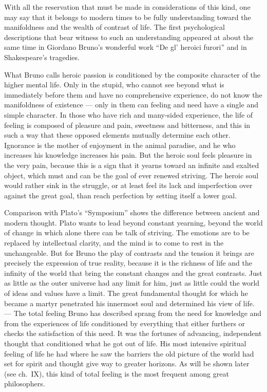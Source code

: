 \documentclass[12pt]{book}
\newcommand{\opage}[1]{\marginnote{\footnotesize\textit{[#1]}}}
\begin{document}
With all the reservation that must be made in considerations of this kind, one
may say that it belongs to modern times to be fully understanding toward the
manifoldness and the wealth of contrast of life. The first psychological
descriptions that bear witness to such an understanding appeared at about the
same time in Giordano Bruno's wonderful work ``De gl' heroici furori'' and in
Shakespeare's tragedies.

What Bruno calls heroic passion is conditioned by the composite character of the
higher mental life. Only in the stupid, who cannot see beyond what is immediately
before them and have no comprehensive experience, do not know the manifoldness of
existence --- only in them can feeling and need have a single and simple
character. In those who have rich and many-sided experience, the life of feeling
is composed of pleasure and pain, sweetness and bitterness, and this in such a way
that these opposed elements mutually determine each other. Ignorance is the mother
of enjoyment in the animal paradise, and he who increases his knowledge increases
his pain. But the heroic soul feels pleasure in the very pain, because this is a
sign that it yearns toward an infinite and exalted object, which must and can be
the goal of ever renewed striving. The heroic soul would rather sink in the
struggle, or at least feel its lack and imperfection over against the great goal,
than reach perfection by setting itself a lower goal.

Comparison with Plato's ``Symposium'' shows the difference between ancient and
modern thought. Plato wants to lead beyond constant yearning, beyond the world of
change in which alone there can be talk of striving. The emotions are to be
replaced by intellectual clarity, and the mind is to come to rest in the
unchangeable. But for Bruno the play of contrasts and the tension it brings are
precisely the expression of true reality, because it is the richness of life and
the infinity of the world that bring the constant changes and the great contrasts.
Just as little as the outer universe had any limit for him, just as little could
the world of \opage{40}ideas and values have a limit. The great fundamental
thought for which he became a martyr penetrated his innermost soul and determined
his view of life. --- The total feeling Bruno has described sprang from the need
for knowledge and from the experiences of life conditioned by everything that
either furthers or checks the satisfaction of this need. It was the fortunes of
advancing, independent thought that conditioned what he got out of life. His most
intensive spiritual feeling of life he had where he saw the barriers the old
picture of the world had set for spirit and thought give way to greater horizons.
As will be shown later (see ch.~IX), this kind of total feeling is the most
frequent among great philosophers.
\end{document}
